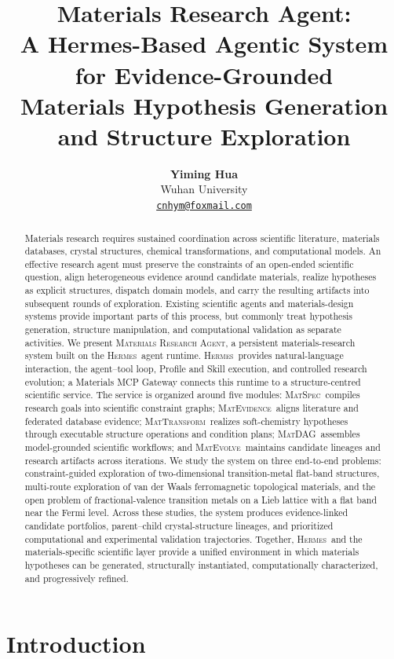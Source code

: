 \documentclass[11pt]{article}
\title{\Large\textbf{Materials Research Agent:}\\[0.15em]
\Large\textbf{A Hermes-Based Agentic System for Evidence-Grounded}\\
\Large\textbf{Materials Hypothesis Generation and Structure Exploration}}
\author{
  \textbf{Yiming Hua}\\[0.2em]
  Wuhan University\\
  \href{mailto:cnhym@foxmail.com}{\texttt{cnhym@foxmail.com}}
}
\date{}
\newcommand{\system}{\textsc{Materials Research Agent}}
\newcommand{\hermes}{\textsc{Hermes}}
\newcommand{\matspec}{\textsc{MatSpec}}
\newcommand{\matevidence}{\textsc{MatEvidence}}
\newcommand{\mattransform}{\textsc{MatTransform}}
\newcommand{\matdag}{\textsc{MatDAG}}
\newcommand{\matevolve}{\textsc{MatEvolve}}
\begin{document}
\maketitle

\begin{abstract}
Materials research requires sustained coordination across scientific literature, materials databases, crystal structures, chemical transformations, and computational models. An effective research agent must preserve the constraints of an open-ended scientific question, align heterogeneous evidence around candidate materials, realize hypotheses as explicit structures, dispatch domain models, and carry the resulting artifacts into subsequent rounds of exploration. Existing scientific agents and materials-design systems provide important parts of this process, but commonly treat hypothesis generation, structure manipulation, and computational validation as separate activities. We present \system, a persistent materials-research system built on the \hermes\ agent runtime. \hermes\ provides natural-language interaction, the agent--tool loop, Profile and Skill execution, and controlled research evolution; a Materials MCP Gateway connects this runtime to a structure-centred scientific service. The service is organized around five modules: \matspec\ compiles research goals into scientific constraint graphs; \matevidence\ aligns literature and federated database evidence; \mattransform\ realizes soft-chemistry hypotheses through executable structure operations and condition plans; \matdag\ assembles model-grounded scientific workflows; and \matevolve\ maintains candidate lineages and research artifacts across iterations. We study the system on three end-to-end problems: constraint-guided exploration of two-dimensional transition-metal flat-band structures, multi-route exploration of van der Waals ferromagnetic topological materials, and the open problem of fractional-valence transition metals on a Lieb lattice with a flat band near the Fermi level. Across these studies, the system produces evidence-linked candidate portfolios, parent--child crystal-structure lineages, and prioritized computational and experimental validation trajectories. Together, \hermes\ and the materials-specific scientific layer provide a unified environment in which materials hypotheses can be generated, structurally instantiated, computationally characterized, and progressively refined.
\end{abstract}

\section{Introduction}
\label{sec:introduction}
\end{document}
